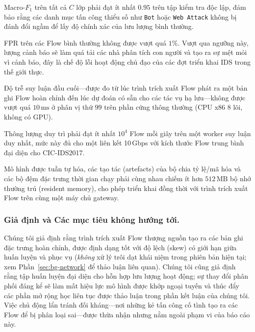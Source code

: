 \begin{description}[leftmargin=1.2em,itemsep=2pt,topsep=2pt]
    \item[Chất lượng phát hiện.] Macro-$F_1$ trên tất cả $C$ lớp phải đạt ít nhất $0.95$ trên tập kiểm tra độc lập, đảm bảo rằng các danh mục tấn công thiểu số như \texttt{Bot} hoặc \texttt{Web Attack} không bị đánh đổi ngầm để lấy độ chính xác của lưu lượng bình thường.
    \item[Tỷ lệ False Positive (FPR).] FPR trên các Flow bình thường không được vượt quá $1\%$. Vượt qua ngưỡng này, lượng cảnh báo sẽ làm quá tải các nhà phân tích con người và tạo ra sự mệt mỏi vì cảnh báo, đây là chế độ lỗi hoạt động chủ đạo của các đợt triển khai IDS trong thế giới thực.
    \item[Độ trễ mỗi Flow.] Độ trễ suy luận đầu cuối---được đo từ lúc trình trích xuất Flow phát ra một bản ghi Flow hoàn chỉnh đến lúc dự đoán có sẵn cho các tác vụ hạ lưu---không được vượt quá $10\,\text{ms}$ ở phân vị thứ $99$ trên phần cứng thông thường (CPU x86 8 lõi, không có GPU).
    \item[Thông lượng.] Thông lượng duy trì phải đạt ít nhất $10^4$ Flow mỗi giây trên một worker suy luận duy nhất, mức này đủ cho một liên kết 10\,Gbps với kích thước Flow trung bình đại diện cho CIC-IDS2017.
    \item[Dấu chân tài nguyên.] Mô hình được tuần tự hóa, các tạo tác (artefacts) của bộ chia tỷ lệ/mã hóa và các bộ đệm đặc trưng thời gian chạy phải cùng nhau chiếm ít hơn $512\,\text{MB}$ bộ nhớ thường trú (resident memory), cho phép triển khai đồng thời với trình trích xuất Flow trên cùng một máy chủ gateway.
\end{description}

\subsubsection*{Giả định và Các mục tiêu không hướng tới.}
Chúng tôi giả định rằng trình trích xuất Flow thượng nguồn tạo ra các bản ghi đặc trưng hoàn chỉnh, được định dạng tốt với độ lệch (skew) có giới hạn giữa huấn luyện và phục vụ (\emph{không} xử lý trôi dạt khái niệm trong phiên bản hiện tại; xem Phần~\ref{sec:bg-network} để thảo luận liên quan). Chúng tôi cũng giả định rằng tập huấn luyện đại diện cho hỗn hợp lưu lượng hoạt động; sự thay đổi phân phối đáng kể sẽ làm mất hiệu lực mô hình được khớp ngoại tuyến và thúc đẩy các phần mở rộng học liên tục được thảo luận trong phần kết luận của chúng tôi. Việc chủ động lẩn tránh đối kháng---nơi những kẻ tấn công cố tình tạo ra các Flow để bị phân loại sai---được thừa nhận nhưng nằm ngoài phạm vi của báo cáo này.
